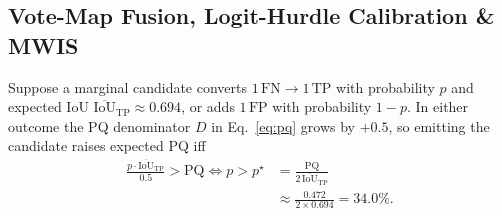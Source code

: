 \documentclass[sigconf]{acmart}
\begin{document}
\subsection{Vote-Map Fusion, Logit-Hurdle Calibration \& MWIS}
Suppose a marginal candidate converts $1\,\mathrm{FN}\to 1\,\mathrm{TP}$ with probability $p$ and expected IoU $\overline{\mathrm{IoU}}_{\mathrm{TP}}\approx 0.694$, or adds $1\,\mathrm{FP}$ with probability $1-p$. In either outcome the PQ denominator $D$ in Eq.~\eqref{eq:pq} grows by $+0.5$, so emitting the candidate raises expected PQ iff
\begin{equation}\label{eq:breakeven}
\begin{aligned}
  \frac{p\cdot \overline{\mathrm{IoU}}_{\mathrm{TP}}}{0.5} > \mathrm{PQ}
  \iff p > p^\star &= \frac{\mathrm{PQ}}{2\,\overline{\mathrm{IoU}}_{\mathrm{TP}}} \\
  &\approx \frac{0.472}{2\times 0.694} = 34.0\%.
\end{aligned}
\end{equation}
\end{document}
